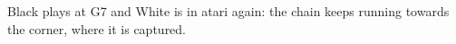\documentclass[border=0.5cm, varwidth=8cm]{standalone}
\begin{document}
	
	\begin{goban}
	\end{goban}

	\smallskip
	Black plays at G7 and White is in atari again: the chain keeps running towards the corner,
	where it is captured.
\end{document}

